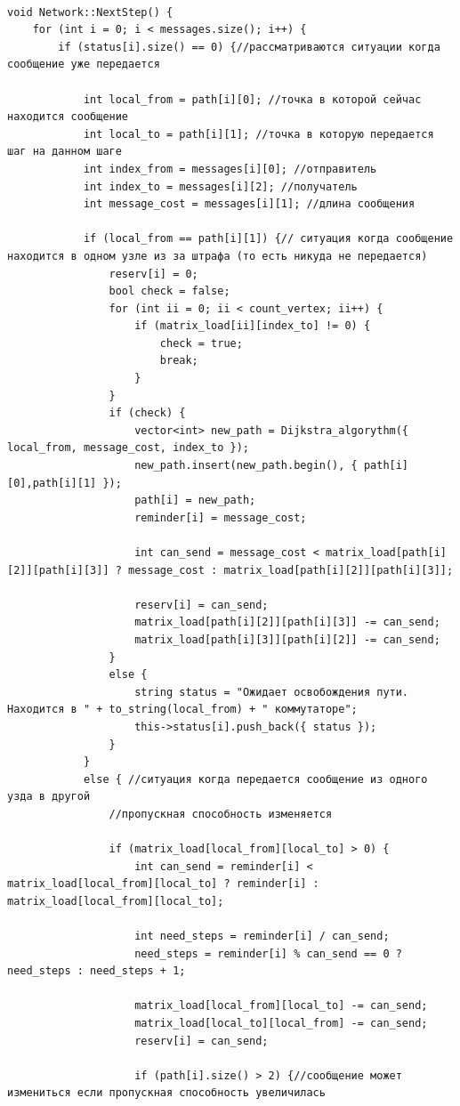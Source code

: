 \documentclass[11pt,a4paper,final]{article} %
\begin{document}
\begin{lstlisting}[label=lst4, caption = {Метод NextStep}]

void Network::NextStep() {
	for (int i = 0; i < messages.size(); i++) {
		if (status[i].size() == 0) {//рассматриваются ситуации когда сообщение уже передается
			
			int local_from = path[i][0]; //точка в которой сейчас находится сообщение
			int local_to = path[i][1]; //точка в которую передается шаг на данном шаге
			int index_from = messages[i][0]; //отправитель
			int index_to = messages[i][2]; //получатель
			int message_cost = messages[i][1]; //длина сообщения
			
			if (local_from == path[i][1]) {// ситyaция когда сообщение находится в одном узле из за штрафа (то есть никуда не передается)
				reserv[i] = 0;
				bool check = false;
				for (int ii = 0; ii < count_vertex; ii++) {
					if (matrix_load[ii][index_to] != 0) {
						check = true;
						break;
					}
				}
				if (check) {
					vector<int> new_path = Dijkstra_algorythm({ local_from, message_cost, index_to });
					new_path.insert(new_path.begin(), { path[i][0],path[i][1] });
					path[i] = new_path;
					reminder[i] = message_cost;
					
					int can_send = message_cost < matrix_load[path[i][2]][path[i][3]] ? message_cost : matrix_load[path[i][2]][path[i][3]];
					
					reserv[i] = can_send;
					matrix_load[path[i][2]][path[i][3]] -= can_send;
					matrix_load[path[i][3]][path[i][2]] -= can_send;
				}
				else {
					string status = "Ожидает освобождения пути. Находится в " + to_string(local_from) + " коммутаторе";
					this->status[i].push_back({ status });
				}
			}
			else { //ситуация когда передается сообщение из одного узда в другой
				//пропускная способность изменяется
				
				if (matrix_load[local_from][local_to] > 0) {
					int can_send = reminder[i] < matrix_load[local_from][local_to] ? reminder[i] : matrix_load[local_from][local_to];
					
					int need_steps = reminder[i] / can_send;
					need_steps = reminder[i] % can_send == 0 ? need_steps : need_steps + 1;
					
					matrix_load[local_from][local_to] -= can_send;
					matrix_load[local_to][local_from] -= can_send;
					reserv[i] = can_send;
					
					if (path[i].size() > 2) {//сообщение может измениться если пропускная способность увеличилась
						

\end{lstlisting}
\end{document}
